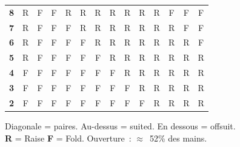 \documentclass[a4paper,11pt]{article}
\begin{document}
\begin{table}[H]
\begin{tabular}{c|*{13}{c}}
\textbf{8} & \cellcolor{raise!15}R & \cellcolor{fold!20}F & \cellcolor{fold!20}F & \cellcolor{raise!10}R & \cellcolor{raise!10}R & \cellcolor{raise!15}R & \cellcolor{raise!25}R & \cellcolor{raise!20}R & \cellcolor{raise!10}R & \cellcolor{raise!10}R & \cellcolor{fold!20}F & \cellcolor{fold!20}F & \cellcolor{fold!20}F \\
\textbf{7} & \cellcolor{raise!10}R & \cellcolor{fold!20}F & \cellcolor{fold!20}F & \cellcolor{fold!20}F & \cellcolor{raise!10}R & \cellcolor{raise!10}R & \cellcolor{raise!15}R & \cellcolor{raise!25}R & \cellcolor{raise!15}R & \cellcolor{raise!10}R & \cellcolor{raise!10}R & \cellcolor{fold!20}F & \cellcolor{fold!20}F \\
\textbf{6} & \cellcolor{raise!10}R & \cellcolor{fold!20}F & \cellcolor{fold!20}F & \cellcolor{fold!20}F & \cellcolor{fold!20}F & \cellcolor{raise!10}R & \cellcolor{raise!10}R & \cellcolor{raise!10}R & \cellcolor{raise!20}R & \cellcolor{raise!10}R & \cellcolor{raise!10}R & \cellcolor{raise!10}R & \cellcolor{fold!20}F \\
\textbf{5} & \cellcolor{raise!10}R & \cellcolor{fold!20}F & \cellcolor{fold!20}F & \cellcolor{fold!20}F & \cellcolor{fold!20}F & \cellcolor{fold!20}F & \cellcolor{raise!10}R & \cellcolor{raise!10}R & \cellcolor{raise!10}R & \cellcolor{raise!20}R & \cellcolor{raise!10}R & \cellcolor{raise!10}R & \cellcolor{raise!10}R \\
\textbf{4} & \cellcolor{fold!20}F & \cellcolor{fold!20}F & \cellcolor{fold!20}F & \cellcolor{fold!20}F & \cellcolor{fold!20}F & \cellcolor{fold!20}F & \cellcolor{fold!20}F & \cellcolor{raise!10}R & \cellcolor{raise!10}R & \cellcolor{raise!10}R & \cellcolor{raise!20}R & \cellcolor{raise!10}R & \cellcolor{raise!10}R \\
\textbf{3} & \cellcolor{fold!20}F & \cellcolor{fold!20}F & \cellcolor{fold!20}F & \cellcolor{fold!20}F & \cellcolor{fold!20}F & \cellcolor{fold!20}F & \cellcolor{fold!20}F & \cellcolor{fold!20}F & \cellcolor{raise!10}R & \cellcolor{raise!10}R & \cellcolor{raise!10}R & \cellcolor{raise!15}R & \cellcolor{raise!10}R \\
\textbf{2} & \cellcolor{fold!20}F & \cellcolor{fold!20}F & \cellcolor{fold!20}F & \cellcolor{fold!20}F & \cellcolor{fold!20}F & \cellcolor{fold!20}F & \cellcolor{fold!20}F & \cellcolor{fold!20}F & \cellcolor{fold!20}F & \cellcolor{raise!10}R & \cellcolor{raise!10}R & \cellcolor{raise!10}R & \cellcolor{raise!15}R \\
\bottomrule
\end{tabular}

\medskip
\footnotesize
Diagonale = paires. Au-dessus = suited. En dessous = offsuit.\\
\textcolor{raise}{\textbf{R}} = Raise \quad \textcolor{fold}{\textbf{F}} = Fold. \quad Ouverture~: $\approx$~52\% des mains.
\end{table}
\end{document}
